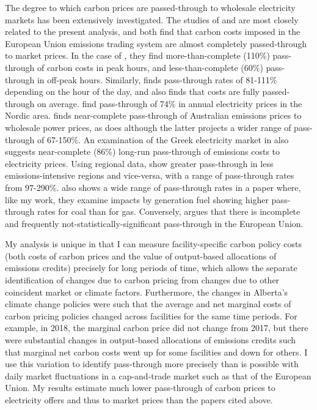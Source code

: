\documentclass[12pt]{article}
\begin{document}
The degree to which carbon prices are passed-through to wholesale electricity markets has been extensively investigated. The studies of \cite{fabra_reguant} and \cite{hintermann16_germany} are most closely related to the present analysis, and both find that carbon costs imposed in the European Union emissions trading system are almost completely passed-through to market prices. In the case of \citeauthor{fabra_reguant}, they find more-than-complete (110\%) pass-through of carbon costs in peak hours, and less-than-complete (60\%) pass-through in off-peak hours. Similarly, \citeauthor{hintermann16_germany} finds pass-through rates of 81-111\% depending on the hour of the day, and also finds that costs are fully passed-through on average. \cite{kara2008impacts} find pass-through of 74\% in annual electricity prices in the Nordic area. \cite{nazifi16} finds near-complete pass-through of Australian emissions prices to wholesale power prices, as does \citet{maryniak2019carbon} although the latter projects a wider range of pass-through of 67-150\%. An examination of the Greek electricity market in \cite{dagoumas2020carbon} also suggests near-complete (86\%) long-run pass-through of emissions costs to electricity prices. Using regional data, \cite{nazifi2021carbon} show greater pass-through in less emissions-intensive regions and vice-versa, with a range of pass-through rates from 97-290\%. \citet{guo2021cost} also shows a wide range of pass-through rates in a paper where, like my work, they examine impacts by generation fuel showing higher pass-through rates for coal than for gas.  Conversely, \cite{jouvet_pass_through} argues that there is incomplete and frequently not-statistically-significant pass-through in the European Union.



My analysis is unique in that I can measure facility-specific carbon policy costs (both costs of carbon prices and the value of output-based allocations of emissions credits) precisely for long periods of time, which allows the separate identification of changes due to carbon pricing from changes due to other coincident market or climate factors. Furthermore, the changes in Alberta's climate change policies were such that the average and net marginal costs of carbon pricing policies changed across facilities for the same time periods. For example, in 2018, the marginal carbon price did not change from 2017, but there were substantial changes in output-based allocations of emissions credits such that marginal net carbon costs went up for some facilities and down for others. I use this variation to identify pass-through more precisely than is possible with daily market fluctuations in a cap-and-trade market such as that of the European Union. My results estimate much lower pass-through of carbon prices to electricity offers and thus to market prices than the papers cited above.
\end{document}
